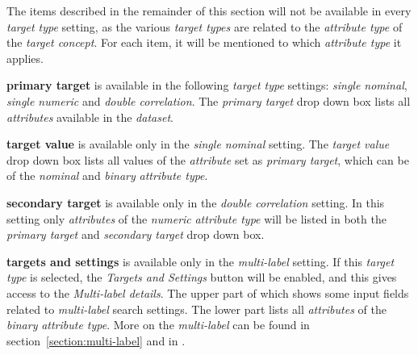 \documentclass{article}
\begin{document}

The items described in the remainder of this section will not be available in every \emph{target type} setting, as the various \emph{target types} are related to the \emph{attribute type} of the \emph{target concept}.
For each item, it will be mentioned to which \emph{attribute type} it applies.

\textbf{primary target} is available in the following \emph{target type} settings: \emph{single nominal}, \emph{single numeric} and \emph{double correlation}.
The \emph{primary target} drop down box lists all \emph{attributes} available in the \emph{dataset}.

\textbf{target value} is available only in the \emph{single nominal} setting.
The \emph{target value} drop down box lists all values of the \emph{attribute} set as \emph{primary target}, which can be of the \emph{nominal} and \emph{binary} \emph{attribute type}.

\textbf{secondary target} is available only in the \emph{double correlation} setting.
In this setting only \emph{attributes} of the \emph{numeric} \emph{attribute type} will be listed in both the \emph{primary target} and \emph{secondary target} drop down box.

\textbf{targets and settings} is available only in the \emph{multi-label} setting.
If this \emph{target type} is selected, the \emph{Targets and Settings} button will be enabled, and this gives access to the \emph{Multi-label details}.
The upper part of which shows some input fields related to \emph{multi-label} search settings.
The lower part lists all \emph{attributes} of the \emph{binary} \emph{attribute type}.
More on the \emph{multi-label} can be found in section~\ref{section:multi-label} and in \cite{emm,sdmbn}.
\end{document}
